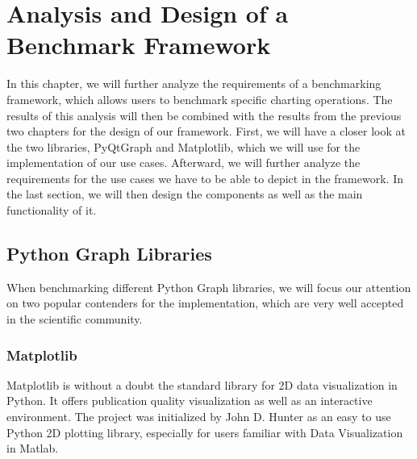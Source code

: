 

\chapter{Analysis and Design of a Benchmark Framework}
\label{ch:analysisAndDesign}

In this chapter, we will further analyze the requirements of a benchmarking
framework, which allows users to benchmark specific charting operations. The
results of this analysis will then be combined with the results from the
previous two chapters for the design of our framework. First, we will have a
closer look at the two libraries, PyQtGraph and Matplotlib, which we will use
for the implementation of our use cases. Afterward, we will further analyze the
requirements for the use cases we have to be able to depict in the framework. In
the last section, we will then design the components as well as the main
functionality of it.



\section{Python Graph Libraries}
\label{sec:application:libraries}

When benchmarking different Python Graph libraries, we will focus our attention
on two popular contenders for the implementation, which are very well accepted
in the scientific community.

\subsection{Matplotlib}
\label{sec:application:libraries:matplotlib}

Matplotlib is without a doubt the standard library for 2D data visualization in
Python. It offers publication quality visualization as well as an interactive
environment. The project was initialized by John D. Hunter as an easy to use
Python 2D plotting library, especially for users familiar with Data
Visualization in Matlab.
\cite{Matplotlib, MatplotlibHistory}

